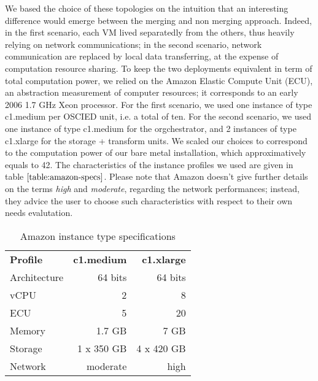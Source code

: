 \documentclass[a4paper, titlepage]{paper}
\numberwithin{figure}{section}
\numberwithin{table}{section}
\begin{document}
      We based the choice of these topologies on the intuition that an interesting difference would emerge between the merging and non merging approach. Indeed, in the first scenario, each VM lived separatedly from the others, thus heavily relying on network communications; in the second scenario, network communication are replaced by local data transferring, at the expense of computation resource sharing. To keep the two deployments equivalent in term of total computation power, we relied on the Amazon Elastic Compute Unit (ECU), an abstraction measurement of computer resources; it corresponds to an early 2006 1.7 GHz Xeon processor. For the first scenario, we used one instance of type c1.medium per OSCIED unit, i.e. a total of ten. For the second scenario, we used one instance of type c1.medium for the orgchestrator, and 2 instances of type c1.xlarge for the storage + transform units. We scaled our choices to correspond to the computation power of our bare metal installation, which approximatively equals to 42. The characteristics of the instance profiles we used are given in table $\ref{table:amazon-specs}$. Please note that Amazon doesn't give further details on the terms \emph{high} and \emph{moderate}, regarding the network performances; instead, they advice the user to choose such characteristics with respect to their own needs evalutation.

      \begin{table}[ht]
        \centering
        \begin{tabular}{lrr}
          \textbf{Profile}  & \textbf{c1.medium}  & \textbf{c1.xlarge}  \\
          Architecture      & 64 bits             & 64 bits             \\
          vCPU              & 2                   & 8                   \\
          ECU               & 5                   & 20                  \\
          Memory            & 1.7 GB              & 7 GB                \\
          Storage           & 1 x 350 GB          & 4 x 420 GB          \\
          Network           & moderate            & high  
        \end{tabular}
        \caption{Amazon instance type specifications}
        \label{table:amazon-specs}
      \end{table}
\end{document}
